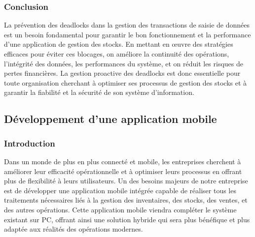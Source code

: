 \documentclass[a4paper, oneside, 12pt, final]{extreport}
\begin{document}
\subsubsection{Conclusion}
La prévention des deadlocks dans la gestion des transactions de saisie de données est un besoin fondamental pour garantir le bon fonctionnement et la performance d'une application de gestion des stocks. En mettant en œuvre des stratégies efficaces pour éviter ces blocages, on améliore la continuité des opérations, l'intégrité des données, les performances du système, et on réduit les risques de pertes financières. La gestion proactive des deadlocks est donc essentielle pour toute organisation cherchant à optimiser ses processus de gestion des stocks et à garantir la fiabilité et la sécurité de son système d'information.
\subsection{Développement d'une application mobile}
\subsubsection{Introduction}
Dans un monde de plus en plus connecté et mobile, les entreprises cherchent à améliorer leur efficacité opérationnelle et à optimiser leurs processus en offrant plus de flexibilité à leurs utilisateurs. Un des besoins majeurs de notre entreprise est de développer une application mobile intégrée capable de réaliser tous les traitements nécessaires liés à la gestion des inventaires, des stocks, des ventes, et des autres opérations. Cette application mobile viendra compléter le système existant sur PC, offrant ainsi une solution hybride qui sera plus bénéfique et plus adaptée aux réalités des opérations modernes.
\end{document}
